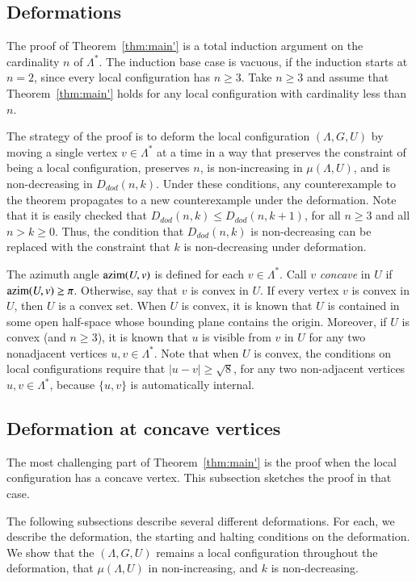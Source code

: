 \documentclass{article} %
\begin{document}
\subsection{Deformations}

The proof of Theorem~\ref{thm:main'} is a total induction argument on
the cardinality $n$ of $\Lambda^*$. The induction base case is
vacuous, if the induction starts at $n=2$, since every local
configuration has $n\ge 3$. Take $n\ge 3$ and assume that
Theorem~\ref{thm:main'} holds for any local configuration with
cardinality less than $n$.

The strategy of the proof is to deform the local configuration
$(\Lambda,G,U)$ by moving a single vertex $v\in\Lambda^*$ at a time in
a way that preserves the constraint of being a local configuration,
preserves $n$, is non-increasing in $\mu(\Lambda,U)$, and is
non-decreasing in $D_{dod}(n,k)$. Under these conditions, any
counterexample to the theorem propagates to a new counterexample under
the deformation. Note that it is easily checked that $D_{dod}(n,k) \le
D_{dod}(n,k+1)$, for all $n\ge 3$ and all $n> k\ge0$. Thus, the
condition that $D_{dod}(n,k)$ is non-decreasing can be replaced with
the constraint that $k$ is non-decreasing under deformation.

The azimuth angle ${\operatorname{azim}}(U,v)$ is defined for each
$v\in\Lambda^*$. Call $v$ {\it concave} in $U$ if
${\operatorname{azim}}(U,v)\ge\pi$. Otherwise, say that $v$ is convex in $U$. If
every vertex $v$ is convex in $U$, then $U$ is a convex set. When $U$
is convex, it is known that $U$ is contained in some open half-space
whose bounding plane contains the origin. Moreover, if $U$ is convex
(and $n\ge 3$), it is known that $u$ is visible from $v$ in $U$ for
any two nonadjacent vertices $u,v\in\Lambda^*$. Note that when $U$ is
convex, the conditions on local configurations require that
$|u-v|\ge\sqrt8$, for any two non-adjacent vertices $u,v\in\Lambda^*$,
because $\{u,v\}$ is automatically internal.

\subsection{Deformation at concave vertices}\label{sec:concave}

The most challenging part  of Theorem~\ref{thm:main'} is the
proof when the local configuration has a concave vertex.  This subsection
sketches the proof in that case.

The following subsections describe several different  deformations.  For each,
we describe the deformation, the starting and halting conditions on 
the deformation.  We show that the $(\Lambda,G,U)$ remains a local
configuration throughout the deformation, 
 that  $\mu(\Lambda,U)$ in non-increasing, and $k$ is
non-decreasing.
\end{document}
